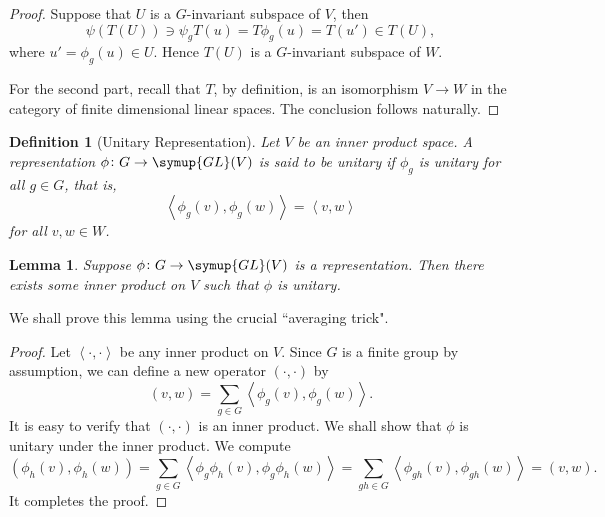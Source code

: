 \documentclass{assignment}[2019/10/15]
\newcommand{\lr}[3]{\left#1#3\right#2}
\theoremstyle{plain}
\newtheorem{definition}[theorem]{Definition}
\newtheorem{lemma}[theorem]{Lemma}
\newcommand{\GL}{\mathop{}\!\symup{GL}}
\newcommand{\blank}{{\cdot}}
\numberwithin{equation}{section}
\begin{document}
    \begin{proof}
        Suppose that $U$ is a $G$-invariant subspace of $V$, then
        \begin{equation}
            \psi(T(U))\ni\psi_gT(u)=T\phi_g(u)=T(u')\in T(U),
        \end{equation}
        where $u' = \phi_g(u)\in U$. Hence $T(U)$ is a $G$-invariant subspace of $W$.

        For the second part, recall that $T$, by definition, is an isomorphism $V\to W$ in the category of finite dimensional linear spaces. The conclusion follows naturally.
    \end{proof}

    \begin{definition}[Unitary Representation]
        Let $V$ be an inner product space. A representation $\phi\colon G\to\GL(V)$ is said to be \emph{unitary} if $\phi_g$ is unitary for all $g\in G$, that is,
        \begin{equation}
            \lr<>{\phi_g(v), \phi_g(w)} = \lr<>{v, w}
        \end{equation}
        for all $v, w\in W$.
    \end{definition}

    \begin{lemma}\label{lem: unitary}
        Suppose $\phi\colon G\to \GL(V)$ is a representation. Then there exists some inner product on $V$ such that $\phi$ is unitary.
    \end{lemma}

    We shall prove this lemma using the crucial ``averaging trick".

    \begin{proof}
        Let $\lr<>{\blank, \blank}$ be any inner product on $V$. Since $G$ is a finite group by assumption, we can define a new operator $(\blank, \blank)$ by
        \begin{equation}
            (v, w) = \sum_{g\in G}\lr<>{\phi_g(v), \phi_g(w)}.
        \end{equation}
        It is easy to verify that $(\blank, \blank)$ is an inner product. We shall show that $\phi$ is unitary under the inner product. We compute
        \begin{equation}
            \left(\phi_h(v), \phi_h(w)\right) = \sum_{g\in G}\lr<>{\phi_g\phi_h(v), \phi_g\phi_h(w)} = \sum_{gh\in G}\lr<>{\phi_{gh}(v), \phi_{gh}(w)} = \lr(){v, w}.
        \end{equation}
        It completes the proof.
    \end{proof}
\end{document}
